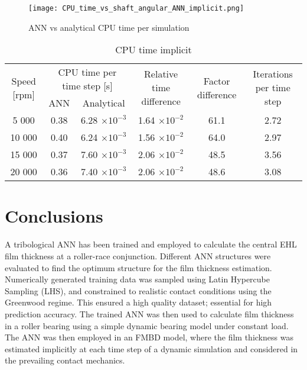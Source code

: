 \begin{figure}
	\centering
	\texttt{[image: CPU\_time\_vs\_shaft\_angular\_ANN\_implicit.png]}
	\caption{ANN vs analytical CPU time per simulation}
	\label{CPU_time_vs_shaft_angular_ANN_implicit}
\end{figure}

\begin{table*}
	\caption{CPU time implicit}
	\label{CPU time implicit}
	\centering
	\renewcommand{\arraystretch}{1.5}%
	\begin{tabular}{|c|c|c|c|c|c|}
		\hline \multirow{2}{*}{ Speed [rpm] } & \multicolumn{2}{|c|}{ CPU time per time step [s] } & \multirow{2}{*}{ Relative time difference } & \multirow{2}{*}{ Factor difference } & \multirow{2}{*}{ Iterations per time step } \\
		\cline { 2 - 3 } & ANN & Analytical & & & \\
		\hline 5 000 & 0.38 & 6.28 $\times 10^{-3}$ & 1.64 $\times 10^{-2}$ & 61.1 & 2.72 \\
		\hline 10 000 & 0.40 & 6.24 $\times 10^{-3}$ & 1.56 $\times 10^{-2}$ & 64.0 & 2.97 \\
		\hline 15 000 & 0.37 & 7.60 $\times 10^{-3}$ & 2.06 $\times 10^{-2}$ & 48.5 & 3.56 \\
		\hline 20 000 & 0.36 & 7.40 $\times 10^{-3}$ & 2.06 $\times 10^{-2}$ & 48.6 & 3.08 \\
		\hline
	\end{tabular}
\end{table*}

\section{Conclusions}

A tribological ANN has been trained and employed to calculate the central EHL film thickness at a roller-race conjunction. Different ANN structures were evaluated to find the optimum structure for the film thickness estimation. Numerically generated training data was sampled using Latin Hypercube Sampling (LHS), and constrained to realistic contact conditions using the Greenwood regime. This ensured a high quality dataset; essential for high prediction accuracy. The trained ANN was then used to calculate film thickness in a roller bearing using a simple dynamic bearing model under constant load. The ANN was then employed in an FMBD model, where the film thickness was estimated implicitly at each time step of a dynamic simulation and considered in the prevailing contact mechanics.


